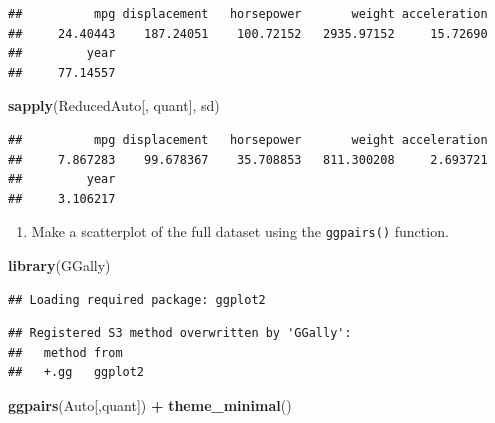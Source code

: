 \documentclass[]{article}
\newenvironment{Shaded}{\begin{snugshade}}{\end{snugshade}}
\newcommand{\KeywordTok}[1]{\textcolor[rgb]{0.13,0.29,0.53}{\textbf{#1}}}
\newcommand{\StringTok}[1]{\textcolor[rgb]{0.31,0.60,0.02}{#1}}
\newcommand{\OperatorTok}[1]{\textcolor[rgb]{0.81,0.36,0.00}{\textbf{#1}}}
\newcommand{\NormalTok}[1]{#1}
\providecommand{\tightlist}{%
  \setlength{\itemsep}{0pt}\setlength{\parskip}{0pt}}
\begin{document}
\begin{verbatim}
##          mpg displacement   horsepower       weight acceleration 
##     24.40443    187.24051    100.72152   2935.97152     15.72690 
##         year 
##     77.14557
\end{verbatim}

\begin{Shaded}
\begin{Highlighting}[]
\KeywordTok{sapply}\NormalTok{(ReducedAuto[, quant], sd)}
\end{Highlighting}
\end{Shaded}

\begin{verbatim}
##          mpg displacement   horsepower       weight acceleration 
##     7.867283    99.678367    35.708853   811.300208     2.693721 
##         year 
##     3.106217
\end{verbatim}

\begin{enumerate}
\def\labelenumi{\alph{enumi})}
\setcounter{enumi}{4}
\tightlist
\item
  Make a scatterplot of the full dataset using the \texttt{ggpairs()}
  function.
\end{enumerate}

\begin{Shaded}
\begin{Highlighting}[]
\KeywordTok{library}\NormalTok{(GGally)}
\end{Highlighting}
\end{Shaded}

\begin{verbatim}
## Loading required package: ggplot2
\end{verbatim}

\begin{verbatim}
## Registered S3 method overwritten by 'GGally':
##   method from   
##   +.gg   ggplot2
\end{verbatim}

\begin{Shaded}
\begin{Highlighting}[]
\KeywordTok{ggpairs}\NormalTok{(Auto[,quant]) }\OperatorTok{+}\StringTok{ }\KeywordTok{theme_minimal}\NormalTok{()}
\end{Highlighting}
\end{Shaded}
\end{document}
